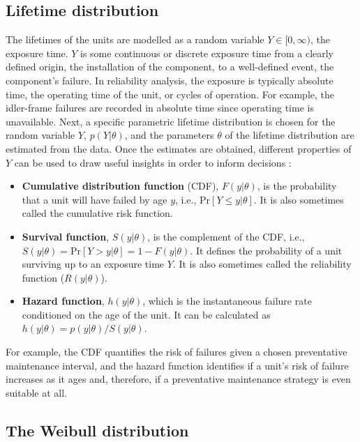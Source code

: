 \subsection{Lifetime distribution}

The lifetimes of the units are modelled as a random variable $Y \in [0, \infty)$, the exposure time. $Y$ is some continuous or discrete exposure time from a clearly defined origin, the installation of the component, to a well-defined event, the component's failure. In reliability analysis, the exposure is typically absolute time, the operating time of the unit, or cycles of operation. For example, the idler-frame failures are recorded in absolute time since operating time is unavailable. Next, a specific parametric lifetime distribution is chosen for the random variable $Y$, $p(Y|\theta)$, and the parameters $\theta$ of the lifetime distribution are estimated from the data. Once the estimates are obtained, different properties of $Y$ can be used to draw useful insights in order to inform decisions \citep{hamada_2008}:
\begin{itemize}
    \item \textbf{Cumulative distribution function} (CDF), $F(y|\theta)$, is the probability that a unit will have failed by age $y$, i.e., $\text{Pr}\left[Y \le y|\theta\right]$. It is also sometimes called the cumulative risk function.
    \item \textbf{Survival function}, $S(y|\theta)$, is the complement of the CDF, i.e., $S(y|\theta) = \text{Pr}\left[Y > y|\theta\right] = 1 - F(y|\theta)$. It defines the probability of a unit surviving up to an exposure time $Y$. It is also sometimes called the reliability function ($R(y|\theta)$).
    \item \textbf{Hazard function}, $h(y|\theta)$, which is the instantaneous failure rate conditioned on the age of the unit. It can be calculated as $h(y|\theta) = p(y|\theta) / S(y|\theta)$.
\end{itemize}
For example, the CDF quantifies the risk of failures given a chosen preventative maintenance interval, and the hazard function identifies if a unit's risk of failure increases as it ages and, therefore, if a preventative maintenance strategy is even suitable at all.

\subsection{The Weibull distribution} \label{subsec:weibull-dist}

